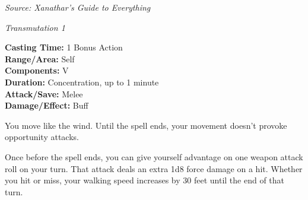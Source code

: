 \documentclass[
  letterpaper,12pt,twoside,twocolumn,openany,
  nodeprecatedcode,bg=full]{dndbook}
\begin{document}
\emph{Source: Xanathar's Guide to Everything}

\emph{Transmutation 1}

\textbf{Casting Time:} 1 Bonus Action\\
\textbf{Range/Area:} Self\\
\textbf{Components:} V\\
\textbf{Duration:} Concentration, up to 1 minute\\
\textbf{Attack/Save:} Melee\\
\textbf{Damage/Effect:} Buff

You move like the wind. Until the spell ends, your movement doesn't
provoke opportunity attacks.

Once before the spell ends, you can give yourself advantage on one
weapon attack roll on your turn. That attack deals an extra 1d8 force
damage on a hit. Whether you hit or miss, your walking speed increases
by 30 feet until the end of that turn.
\end{document}
